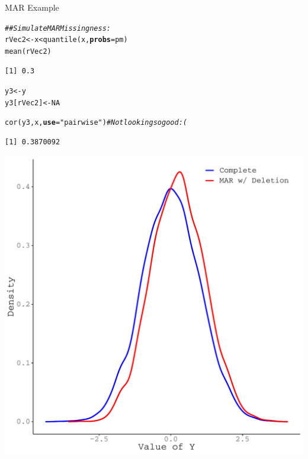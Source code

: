 \documentclass{beamer}\usepackage[]{graphicx}\usepackage[]{color}
\makeatletter
\newcommand{\hlnum}[1]{\textcolor[rgb]{0.69,0.494,0}{#1}}%
\newcommand{\hlstr}[1]{\textcolor[rgb]{0.749,0.012,0.012}{#1}}%
\newcommand{\hlcom}[1]{\textcolor[rgb]{0.514,0.506,0.514}{\textit{#1}}}%
\newcommand{\hlopt}[1]{\textcolor[rgb]{0,0,0}{#1}}%
\newcommand{\hlstd}[1]{\textcolor[rgb]{0,0,0}{#1}}%
\newcommand{\hlkwb}[1]{\textcolor[rgb]{0,0.341,0.682}{#1}}%
\newcommand{\hlkwc}[1]{\textcolor[rgb]{0,0,0}{\textbf{#1}}}%
\newcommand{\hlkwd}[1]{\textcolor[rgb]{0.004,0.004,0.506}{#1}}%
\newenvironment{kframe}{%
 \def\at@end@of@kframe{}%
 \ifinner\ifhmode%
  \def\at@end@of@kframe{\end{minipage}}%
  \begin{minipage}{\columnwidth}%
 \fi\fi%
 \def\FrameCommand##1{\hskip\@totalleftmargin \hskip-\fboxsep
 \colorbox{shadecolor}{##1}\hskip-\fboxsep
     \hskip-\linewidth \hskip-\@totalleftmargin \hskip\columnwidth}%
 \MakeFramed {\advance\hsize-\width
   \@totalleftmargin\z@ \linewidth\hsize
   \@setminipage}}%
 {\par\unskip\endMakeFramed%
 \at@end@of@kframe}
\newenvironment{knitrout}{}{} %
\makeatother
\begin{document}

\begin{frame}{MAR Example}
  
\begin{knitrout}\footnotesize
{}\color{fgcolor}\begin{kframe}
\begin{alltt}
\hlcom{## Simulate MAR Missingness:}
\hlstd{rVec2} \hlkwb{<-} \hlstd{x} \hlopt{<} \hlkwd{quantile}\hlstd{(x,} \hlkwc{probs} \hlstd{= pm)}
\hlkwd{mean}\hlstd{(rVec2)}
\end{alltt}
\begin{verbatim}
[1] 0.3
\end{verbatim}
\begin{alltt}
\hlstd{y3} \hlkwb{<-} \hlstd{y}
\hlstd{y3[rVec2]} \hlkwb{<-} \hlnum{NA}

\hlkwd{cor}\hlstd{(y3, x,} \hlkwc{use} \hlstd{=} \hlstr{"pairwise"}\hlstd{)} \hlcom{# Not looking so good :(}
\end{alltt}
\begin{verbatim}
[1] 0.3870092
\end{verbatim}
\end{kframe}
\end{knitrout}

\pagebreak

\begin{knitrout}\footnotesize
{}\color{fgcolor}

{\centering \includegraphics[width=0.65\linewidth]{figure/intro-unnamed-chunk-14-1} 

}


\end{knitrout}

\end{frame}
\end{document}
